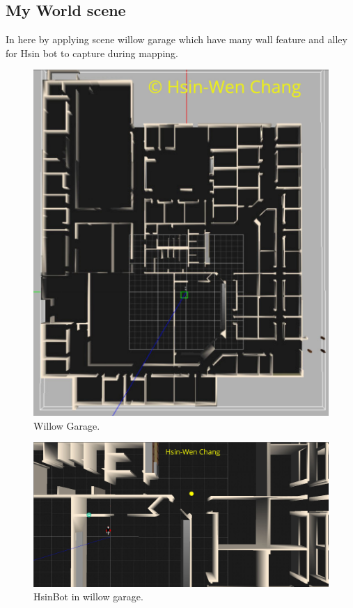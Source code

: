 \documentclass[10pt,journal,compsoc]{IEEEtran}
\begin{document}
\subsection{My World scene}
In here by applying scene willow garage which have many wall feature and alley for Hsin bot to capture during mapping.

\begin{figure}[thpb]
      \centering
      \includegraphics[width=\linewidth]{willowgarage.png}
      \caption{Willow Garage.}
      \label{fig:robot1}
\end{figure}
\begin{figure}[thpb]
      \centering
      \includegraphics[width=\linewidth]{willowgarageHsinBot.png}
      \caption{HsinBot in willow garage.}
      \label{fig:robot1}
\end{figure}
\end{document}

